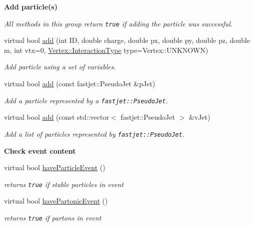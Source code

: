 \begin{Indent}{\bf Add particle(s)}\par
{\em All methods in this group return {\tt true} if adding the particle was successful. }\begin{CompactItemize}
\item 
virtual bool \hyperlink{classEvent_bed4fa66809b95131871c0e8040d6b2c}{add} (int ID, double charge, double px, double py, double pz, double m, int vtx=0, \hyperlink{classVertex_0d80a5c5ed3bd9be72a325aa448eca25}{Vertex::Interaction\-Type} type=Vertex::UNKNOWN)
\begin{CompactList}\small\item\em Add particle using a set of variables. \item\end{CompactList}\item 
virtual bool \hyperlink{classEvent_f14e917b52b542b5d3bcbc62524d3eda}{add} (const fastjet::Pseudo\-Jet \&p\-Jet)
\begin{CompactList}\small\item\em Add a particle represented by a {\tt fastjet::Pseudo\-Jet}. \item\end{CompactList}\item 
virtual bool \hyperlink{classEvent_4e9ebea3ebf37625b7dfc89c4839354a}{add} (const std::vector$<$ fastjet::Pseudo\-Jet $>$ \&v\-Jet)
\begin{CompactList}\small\item\em Add a list of particles represented by {\tt fastjet::Pseudo\-Jet}. \item\end{CompactList}\end{CompactItemize}
\end{Indent}
\begin{Indent}{\bf Check event content}\par
\begin{CompactItemize}
\item 
\hypertarget{classEvent_82d35321ab3cfb184d96fc51414478c9}{
virtual bool \hyperlink{classEvent_82d35321ab3cfb184d96fc51414478c9}{have\-Particle\-Event} ()}
\label{classEvent_82d35321ab3cfb184d96fc51414478c9}

\begin{CompactList}\small\item\em returns {\tt true} if stable particles in event \item\end{CompactList}\item 
\hypertarget{classEvent_80f0f86ec7583375acb8276fe3dfa1e7}{
virtual bool \hyperlink{classEvent_80f0f86ec7583375acb8276fe3dfa1e7}{have\-Partonic\-Event} ()}
\label{classEvent_80f0f86ec7583375acb8276fe3dfa1e7}

\begin{CompactList}\small\item\em returns {\tt true} if partons in event \item\end{CompactList}\end{CompactItemize}
\end{Indent}
